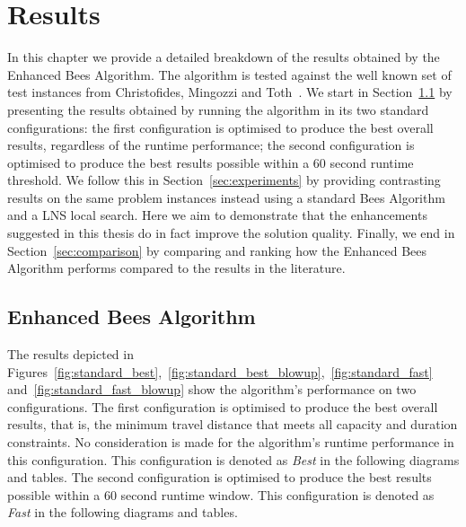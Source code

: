 
\chapter{Results}
\label{chap:results}

In this chapter we provide a detailed breakdown of the results obtained by the Enhanced Bees Algorithm. The algorithm is tested against the well known set of test instances from Christofides, Mingozzi and Toth~\cite{CMT:1981}. We start in Section~\ref{sec:standardresults} by presenting the results obtained by running the algorithm in its two standard configurations: the first configuration is optimised to produce the best overall results, regardless of the runtime performance; the second configuration is optimised to produce the best results possible within a 60 second runtime threshold. We follow this in Section~\ref{sec:experiments} by providing contrasting results on the same problem instances instead using a standard Bees Algorithm and a LNS local search. Here we aim to demonstrate that the enhancements suggested in this thesis do in fact improve the solution quality. Finally, we end in Section~\ref{sec:comparison} by comparing and ranking how the Enhanced Bees Algorithm performs compared to the results in the literature. 

\section{Enhanced Bees Algorithm}
\label{sec:standardresults}

The results depicted in Figures~\ref{fig:standard_best},~\ref{fig:standard_best_blowup},~\ref{fig:standard_fast} and~\ref{fig:standard_fast_blowup} show the algorithm's performance on two configurations. The first configuration is optimised to produce the best overall results, that is, the minimum travel distance that meets all capacity and duration constraints. No consideration is made for the algorithm's runtime performance in this configuration. This configuration is denoted as \emph{Best} in the following diagrams and tables. The second configuration is optimised to produce the best results possible within a 60 second runtime window. This configuration is denoted as \emph{Fast} in the following diagrams and tables.



